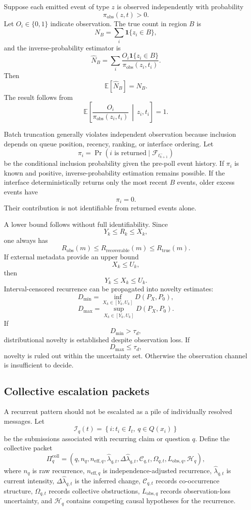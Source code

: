 \documentclass[11pt]{article}
\theoremstyle{definition}
\DeclareMathOperator{\Prob}{Pr}
\newcommand{\E}{\mathbb{E}}
\newcommand{\given}{\,\middle|\,}
\newcommand{\ind}{\mathbf{1}}
\begin{document}
Suppose each emitted event of type \(z\) is observed independently with probability
\[
\pi_{\mathrm{obs}}(z,t)>0.
\]
Let \(O_i\in\{0,1\}\) indicate observation. The true count in region \(B\) is
\[
N_B
=
\sum_i\ind\{z_i\in B\},
\]
and the inverse-probability estimator is
\[
\widehat N_B
=
\sum_i
\frac{
O_i\ind\{z_i\in B\}
}{
\pi_{\mathrm{obs}}(z_i,t_i)
}.
\]
Then
\[
\E[\widehat N_B]=N_B.
\]
The result follows from
\[
\E\!\left[
\frac{O_i}{\pi_{\mathrm{obs}}(z_i,t_i)}
\given z_i,t_i
\right]
=1.
\]

Batch truncation generally violates independent observation because inclusion depends on queue position, recency, ranking, or interface ordering. Let
\[
\pi_i
=
\Prob(
i\text{ is returned}
\mid
\mathcal{F}_{t_{k+1}^{-}}
)
\]
be the conditional inclusion probability given the pre-poll event history. If \(\pi_i\) is known and positive, inverse-probability estimation remains possible. If the interface deterministically returns only the most recent \(B\) events, older excess events have
\[
\pi_i=0.
\]
Their contribution is not identifiable from returned events alone.

A lower bound follows without full identifiability. Since
\[
Y_k\leq R_k\leq X_k,
\]
one always has
\[
R_{\mathrm{obs}}(m)
\leq
R_{\mathrm{recoverable}}(m)
\leq
R_{\mathrm{true}}(m).
\]
If external metadata provide an upper bound
\[
X_k\leq U_k,
\]
then
\[
Y_k
\leq X_k\leq U_k.
\]
Interval-censored recurrence can be propagated into novelty estimates:
\[
D_{\min}
=
\inf_{
X_k\in[Y_k,U_k]
}
D(P_X,P_0),
\]
\[
D_{\max}
=
\sup_{
X_k\in[Y_k,U_k]
}
D(P_X,P_0).
\]
If
\[
D_{\min}>\tau_d,
\]
distributional novelty is established despite observation loss. If
\[
D_{\max}\leq\tau_d,
\]
novelty is ruled out within the uncertainty set. Otherwise the observation channel is insufficient to decide.

\subsection{Collective escalation packets}

A recurrent pattern should not be escalated as a pile of individually resolved messages. Let
\[
\mathcal{I}_q(t)
=
\left\{
i:t_i\in I_t,\ q\in Q(x_i)
\right\}
\]
be the submissions associated with recurring claim or question \(q\). Define the collective packet
\[
\Pi_q^{\mathrm{coll}}
=
\left(
q,
n_q,
n_{\mathrm{eff},q},
\widehat{\lambda}_{q,t},
\Delta\widehat{\lambda}_{q,t},
\mathcal{C}_{q,t},
\Omega_{q,t},
L_{\mathrm{obs},q},
\mathcal{H}_{q}
\right),
\]
where \(n_q\) is raw recurrence, \(n_{\mathrm{eff},q}\) is independence-adjusted recurrence, \(\widehat{\lambda}_{q,t}\) is current intensity, \(\Delta\widehat{\lambda}_{q,t}\) is the inferred change, \(\mathcal{C}_{q,t}\) records co-occurrence structure, \(\Omega_{q,t}\) records collective obstructions, \(L_{\mathrm{obs},q}\) records observation-loss uncertainty, and \(\mathcal{H}_q\) contains competing causal hypotheses for the recurrence.
\end{document}
